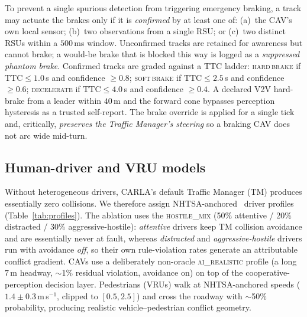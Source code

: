 \documentclass[11pt]{article}
\begin{document}
To prevent a single spurious detection from triggering emergency braking, a track
may actuate the brakes only if it is \emph{confirmed} by at least one of:
(a)~the CAV's own local sensor; (b)~two observations from a single RSU; or
(c)~two distinct RSUs within a $500$\,ms window. Unconfirmed tracks are retained
for awareness but cannot brake; a would-be brake that is blocked this way is logged
as a \emph{suppressed phantom brake}. Confirmed tracks are graded against a TTC
ladder:
\textsc{hard\,brake} if $\mathrm{TTC}\leq 1.0$\,s and confidence $\geq 0.8$;
\textsc{soft\,brake} if $\mathrm{TTC}\leq 2.5$\,s and confidence $\geq 0.6$;
\textsc{decelerate} if $\mathrm{TTC}\leq 4.0$\,s and confidence $\geq 0.4$.
A declared V2V hard-brake from a leader within $40$\,m and the forward cone
bypasses perception hysteresis as a trusted self-report. The brake override is
applied for a single tick and, critically, \emph{preserves the Traffic Manager's
steering} so a braking CAV does not arc wide mid-turn.

\subsection{Human-driver and VRU models}
Without heterogeneous drivers, CARLA's default Traffic Manager (TM) produces
essentially zero collisions. We therefore assign NHTSA-anchored~\cite{nhtsa2024}
driver profiles (Table~\ref{tab:profiles}). The ablation uses the
\textsc{hostile\_mix} (50\% attentive / 20\% distracted / 30\%
aggressive-hostile): \emph{attentive} drivers keep TM collision avoidance and are
essentially never at fault, whereas \emph{distracted} and \emph{aggressive-hostile}
drivers run with avoidance \emph{off}, so their own rule-violation rates generate
an attributable conflict gradient. CAVs use a deliberately non-oracle
\textsc{ai\_realistic} profile (a long $7$\,m headway, $\sim$1\% residual
violation, avoidance on) on top of the cooperative-perception decision layer.
Pedestrians (VRUs) walk at NHTSA-anchored speeds ($1.4\pm0.3$\,m\,s$^{-1}$, clipped
to $[0.5,2.5]$) and cross the roadway with $\sim$50\% probability, producing
realistic vehicle--pedestrian conflict geometry.
\end{document}
